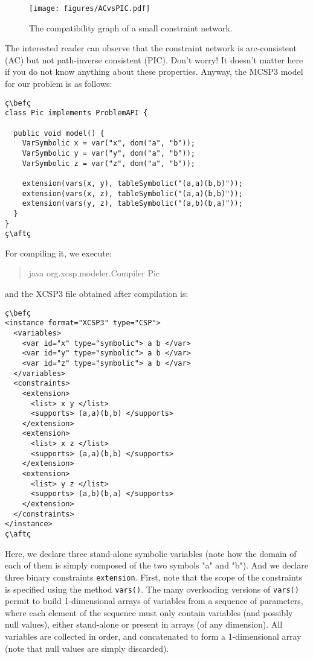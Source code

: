 \documentclass[10pt]{article}
\def\xt{{\rm XCSP3}\xspace}
\newcommand{\gb}[1]{{\tt #1}} %
\newcommand{\nn}[1]{{\tt #1}} %
\def\mt{{\rm MCSP3}\xspace}
\def\xt{{\rm XCSP3}\xspace}
\newenvironment{myvb}{\endgraf\small\verbatim}{\endverbatim}
\def\bef{\rule{10cm}{0.1mm}} %
\def\aft{\rule{10cm}{0.1mm}\medskip}
\begin{document}
\begin{figure}[h!]
\begin{center}
  \texttt{[image: figures/ACvsPIC.pdf]}
\end{center}
\caption{The compatibility graph of a small constraint network.\label{fig:small}}
\end{figure}

The interested reader can observe that the constraint network is arc-consistent (AC) but not path-inverse consistent (PIC).
Don't worry! It doesn't matter here if you do not know anything about these properties. 
Anyway, the \mt model for our problem is as follows:


\begin{lstlisting}
ç\befç
class Pic implements ProblemAPI {
  
  public void model() {
    VarSymbolic x = var("x", dom("a", "b"));
    VarSymbolic y = var("y", dom("a", "b"));
    VarSymbolic z = var("z", dom("a", "b"));
    
    extension(vars(x, y), tableSymbolic("(a,a)(b,b)"));
    extension(vars(x, z), tableSymbolic("(a,a)(b,b)"));
    extension(vars(y, z), tableSymbolic("(a,b)(b,a)"));
  }
}
ç\aftç
\end{lstlisting}
For compiling it, we execute:
\begin{quote}
\begin{myvb}
java org.xcsp.modeler.Compiler Pic
\end{myvb}
\end{quote}
and the \xt file obtained after compilation is:
\begin{lstlisting}
ç\befç
<instance format="XCSP3" type="CSP">
  <variables>
    <var id="x" type="symbolic"> a b </var>
    <var id="y" type="symbolic"> a b </var>
    <var id="z" type="symbolic"> a b </var>
  </variables>
  <constraints>
    <extension>
      <list> x y </list>
      <supports> (a,a)(b,b) </supports>
    </extension>
    <extension>
      <list> x z </list>
      <supports> (a,a)(b,b) </supports>
    </extension>
    <extension>
      <list> y z </list>
      <supports> (a,b)(b,a) </supports>
    </extension>
  </constraints>
</instance>
ç\aftç
\end{lstlisting}

Here, we declare three stand-alone symbolic variables (note how the domain of each of them is simply composed of the two symbols "a" and "b").
And we declare three binary constraints \gb{extension}. First, note that the scope of the constraints is specified using the method \nn{vars()}.
The many overloading versions of \nn{vars()} permit to build 1-dimensional arrays of variables from a sequence of parameters, where each element of the sequence must only contain variables (and possibly null values), either stand-alone or present in arrays (of any dimension).
All variables are collected in order, and concatenated to form a 1-dimensional array (note that null values are simply discarded).
\end{document}
